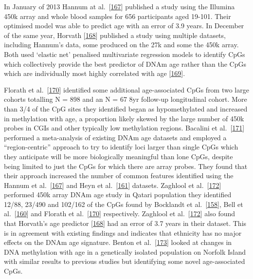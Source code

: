 \documentclass[
]{book}
\begin{document}
In January of 2013 Hannum at al.~{[}\protect\hyperlink{ref-Hannum2013}{167}{]} published a study using the Illumina 450k array and whole blood samples for 656 participants aged 19-101.
Their optimised model was able to predict age with an error of 3.9 years.
In December of the same year, Horvath {[}\protect\hyperlink{ref-Horvath2013}{168}{]} published a study using multiple datasets, including Hannum's data, some produced on the 27k and some the 450k array.
Both used `elastic net' penalised multivariate regression models to identify CpGs which collectively provide the best predictor of DNAm age rather than the CpGs which are individually most highly correlated with age {[}\protect\hyperlink{ref-Friedman2010}{169}{]}.

Florath et al.~{[}\protect\hyperlink{ref-Florath2014}{170}{]} identified some additional age-associated CpGs from two large cohorts totalling N = 898 and an N = 67 8yr follow-up longitudinal cohort.
More than 3/4 of the CpG sites they identified began as hypomethylated and increased in methylation with age, a proportion likely skewed by the large number of 450k probes in CGIs and other typically low methylation regions.
Bacalini et al.~{[}\protect\hyperlink{ref-Bacalini2015}{171}{]} performed a meta-analysis of existing DNAm age datasets and employed a ``region-centric'' approach to try to identify loci larger than single CpGs which they anticipate will be more biologically meaningful than lone CpGs, despite being limited to just the CpGs for which there are array probes.
They found that their approach increased the number of common features identified using the Hannum et al.~{[}\protect\hyperlink{ref-Hannum2013}{167}{]} and Heyn et al.~{[}\protect\hyperlink{ref-Heyn2012}{161}{]} datasets.
Zaghlool et al.~{[}\protect\hyperlink{ref-Zaghlool2015}{172}{]} performed 450k array DNAm age study in Qatari population they identified 12/88, 23/490 and 102/162 of the CpGs found by Bocklandt et al.~{[}\protect\hyperlink{ref-Bocklandt2011}{158}{]}, Bell et al.~{[}\protect\hyperlink{ref-Bell2012}{160}{]} and Florath et al.~{[}\protect\hyperlink{ref-Florath2014}{170}{]} respectively. Zaghlool et al.~{[}\protect\hyperlink{ref-Zaghlool2015}{172}{]} also found that Horvath's age predictor {[}\protect\hyperlink{ref-Horvath2013}{168}{]} had an error of 3.7 years in their dataset.
This is in agreement with existing findings and indicates that ethnicity has no major effects on the DNAm age signature. Benton et al.~{[}\protect\hyperlink{ref-Benton2017}{173}{]} looked at changes in DNA methylation with age in a genetically isolated population on Norfolk Island with similar results to previous studies but identifying some novel age-associated CpGs.
\end{document}

